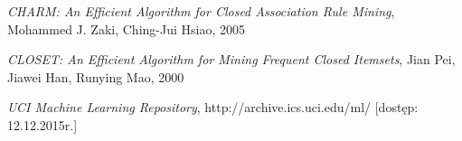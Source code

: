 
\begin{thebibliography}{99}

 \emph{CHARM: An Efficient Algorithm for Closed Association Rule Mining}, Mohammed J. Zaki, Ching-Jui Hsiao, 2005

 \emph{CLOSET: An Efficient Algorithm for Mining Frequent Closed Itemsets}, Jian Pei, Jiawei Han, Runying Mao, 2000

 \emph{UCI Machine Learning Repository}, http://archive.ics.uci.edu/ml/ [dostęp: 12.12.2015r.]

\end{thebibliography}
